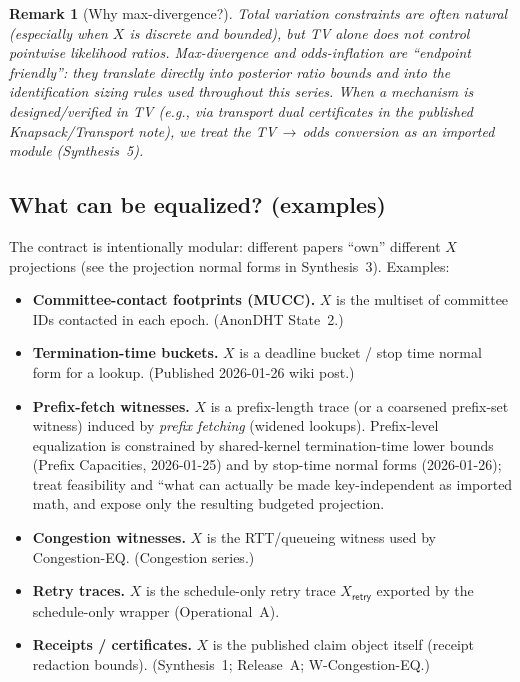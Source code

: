 \documentclass[11pt]{article}
\newtheorem{remark}{Remark}
\begin{document}
\begin{remark}[Why max-divergence?]
Total variation constraints are often natural (especially when $X$ is discrete and bounded), but TV alone does not control pointwise likelihood ratios.
Max-divergence and odds-inflation are ``endpoint friendly'': they translate directly into posterior ratio bounds and into the identification sizing rules used throughout this series.\cite{series:oddsinflation,series:endpointbridge}
When a mechanism is designed/verified in TV (e.g., via transport dual certificates in the published Knapsack/Transport note\cite{series:knapsacktransport}), we treat the TV\,$\to$\,odds conversion as an imported module (Synthesis~5).
\end{remark}

\subsection{What can be equalized? (examples)}
The contract is intentionally modular: different papers ``own'' different $X$ projections (see the projection normal forms in Synthesis~3).\cite{series:traceifaces}
Examples:
\begin{itemize}[leftmargin=*]
\item \textbf{Committee-contact footprints (MUCC).} $X$ is the multiset of committee IDs contacted in each epoch. (AnonDHT State~2.)
\item \textbf{Termination-time buckets.} $X$ is a deadline bucket / stop time normal form for a lookup. (Published 2026-01-26 wiki post.)
\item \textbf{Prefix-fetch witnesses.} $X$ is a prefix-length trace (or a coarsened prefix-set witness) induced by \emph{prefix fetching} (widened lookups).
Prefix-level equalization is constrained by shared-kernel termination-time lower bounds (Prefix Capacities, 2026-01-25) and by stop-time normal forms (2026-01-26); treat feasibility and ``what can actually be made key-independent as imported math, and expose only the resulting budgeted projection.\cite{series:prefixcapacities,series:stoptimeaddendum}
\item \textbf{Congestion witnesses.} $X$ is the RTT/queueing witness used by Congestion-EQ. (Congestion series.)
\item \textbf{Retry traces.} $X$ is the schedule-only retry trace $X_{\mathsf{retry}}$ exported by the schedule-only wrapper (Operational~A).\cite{series:operationalA}
\item \textbf{Receipts / certificates.} $X$ is the published claim object itself (receipt redaction bounds). (Synthesis~1; Release~A; W-Congestion-EQ.)
\end{itemize}
\end{document}
